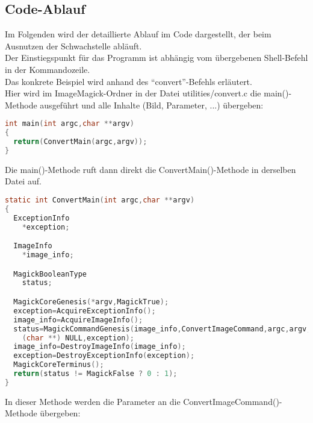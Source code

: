 \subsection{Code-Ablauf}\label{subsec:code-ablauf}

Im Folgenden wird der detaillierte Ablauf im Code dargestellt, der beim Ausnutzen der Schwachstelle abläuft.\\

Der Einstiegspunkt für das Programm ist abhängig vom übergebenen Shell-Befehl in der Kommandozeile.\\

Das konkrete Beispiel wird anhand des "`convert"'-Befehls erläutert.\\

Hier wird im ImageMagick-Ordner in der Datei utilities/convert.c die main()-Methode ausgeführt und alle Inhalte (Bild, Parameter, ...) übergeben:\\

\begin{lstlisting}[firstnumber=90, language=C, caption=utilities/convert.c Einstieg main(),label={lst:lstlisting}]
int main(int argc,char **argv)
{
  return(ConvertMain(argc,argv));
}
\end{lstlisting}
\vspace{5mm}

Die main()-Methode ruft dann direkt die ConvertMain()-Methode in derselben Datei auf.\\

\begin{lstlisting}[firstnumber=67, language=C, caption=utilities/convert.c ConvertMain(),label={lst:lstlisting}]
static int ConvertMain(int argc,char **argv)
{
  ExceptionInfo
    *exception;

  ImageInfo
    *image_info;

  MagickBooleanType
    status;

  MagickCoreGenesis(*argv,MagickTrue);
  exception=AcquireExceptionInfo();
  image_info=AcquireImageInfo();
  status=MagickCommandGenesis(image_info,ConvertImageCommand,argc,argv,
    (char **) NULL,exception);
  image_info=DestroyImageInfo(image_info);
  exception=DestroyExceptionInfo(exception);
  MagickCoreTerminus();
  return(status != MagickFalse ? 0 : 1);
}
\end{lstlisting}
\vspace{5mm}

In dieser Methode werden die Parameter an die ConvertImageCommand()-Methode übergeben:\\

